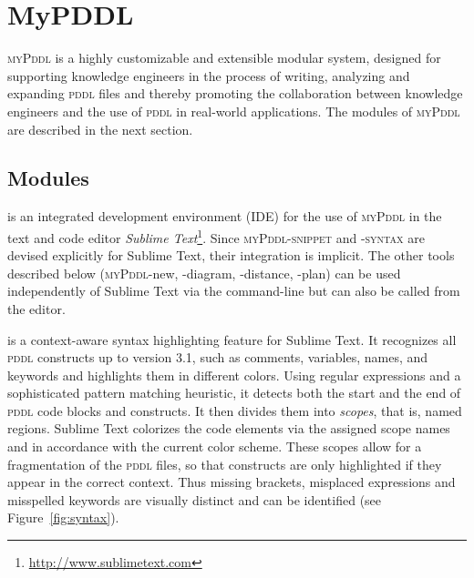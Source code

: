 \documentclass[runningheads]{llncs}
\newcommand{\mypddl}{\textsc{myPddl}\xspace}
\newcommand{\mypddlsnippet}{\textsc{myPddl-snippet}\xspace}
\newcommand{\pddl}{\textsc{pddl}\xspace}
\newcommand{\sublimetext}{Sublime Text\xspace}
\begin{document}
\section{MyPDDL}
\label{sec:mypddl}

\mypddl is a highly customizable and extensible modular system,
designed for supporting knowledge engineers in the process of writing,
analyzing and expanding \pddl files and thereby promoting the
collaboration between knowledge engineers and the use of \pddl in
real-world applications. The modules of \mypddl are described in the
next section.

\subsection{Modules}

\begin{description}
  \setlength\itemsep{1em}
\item[myPDDL-IDE] is an integrated development environment (IDE) for
  the use of \mypddl in the text and code editor \emph{Sublime
    Text}\footnote{\url{http://www.sublimetext.com}}. Since
  \mypddlsnippet and \textsc{-syntax} are devised explicitly for
  \sublimetext, their integration is implicit. The other tools
  described below (\mypddl-new, -diagram, -distance, -plan) can be
  used independently of \sublimetext via the command-line but can also
  be called from the editor.

\item[myPDDL-syntax] is a context-aware syntax highlighting feature
  for \sublimetext. It recognizes all \pddl constructs up to version
  3.1, such as comments, variables, names, and keywords and highlights
  them in different colors. Using regular expressions and a
  sophisticated pattern matching heuristic, it detects both the start
  and the end of \pddl code blocks and constructs. It then divides
  them into \emph{scopes}, that is, named regions. \sublimetext
  colorizes the code elements via the assigned scope names and in
  accordance with the current color scheme. These scopes allow for a
  fragmentation of the \pddl files, so that constructs are only
  highlighted if they appear in the correct context. Thus missing
  brackets, misplaced expressions and misspelled keywords are visually
  distinct and can be identified (see Figure~\ref{fig:syntax}).


\end{description}
\end{document}
